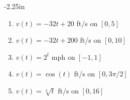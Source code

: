 \begin{adjustwidth*}{}{-2.25in}
\begin{multicols*}{2}

\begin{enumerate}[1),resume]
\item $v(t) = -32t+20$ ft/s on $[0,5]$
\item $v(t) = -32t+200$ ft/s on $[0,10]$
\item $v(t) = 2^t$ mph on $[-1,1]$
\item $v(t) = \cos (t)$ ft/s on $[0,3\pi/2]$
\item $v(t) = \sqrt[4]{t}$ ft/s on $[0,16]$
\end{enumerate}

\end{multicols*}
\end{adjustwidth*}

\clearpage

